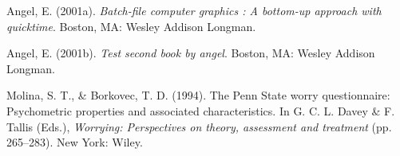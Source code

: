 \documentclass[12pt,oneside]{chicagocapstone}
\begin{document}
\leavevmode\hypertarget{ref-angel2001}{}%
Angel, E. (2001a). \emph{Batch-file computer graphics : A bottom-up approach with quicktime}. Boston, MA: Wesley Addison Longman.

\leavevmode\hypertarget{ref-angel2002a}{}%
Angel, E. (2001b). \emph{Test second book by angel}. Boston, MA: Wesley Addison Longman.

\leavevmode\hypertarget{ref-Molina1994}{}%
Molina, S. T., \& Borkovec, T. D. (1994). The Penn State worry questionnaire: Psychometric properties and associated characteristics. In G. C. L. Davey \& F. Tallis (Eds.), \emph{Worrying: Perspectives on theory, assessment and treatment} (pp. 265--283). New York: Wiley.


\end{document}
